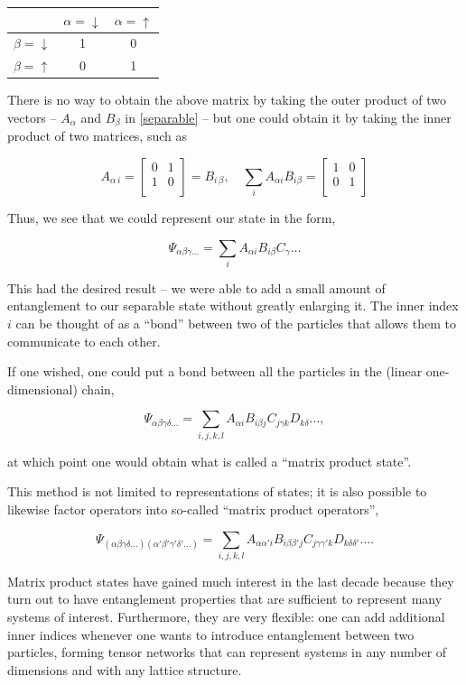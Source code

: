 \documentclass[12pt]{amsbook}
\theoremstyle{plain}
\theoremstyle{definition}
\theoremstyle{remark}
\newcommand{\bmat}[4]{
\begin{bmatrix}
#1 & #2\\
#3 & #4\\
\end{bmatrix}
}
\newcommand{\eqn}[2][]{\begin{equation}\label{#1}#2\end{equation}}
\begin{document}
\begin{center}
\begin{tabular}{c||c|c}
               & $\alpha=\downarrow$ & $\alpha=\uparrow$ \\
\hline
\hline
$\beta=\downarrow$ &       1        &       0      \\
\hline
$\beta=\uparrow$   &       0        &       1
\end{tabular}
\end{center}

There is no way to obtain the above matrix by taking the outer product of two vectors -- $A_\alpha$ and $B_\beta$ in \eqref{separable} -- but one could obtain it by taking the inner product of two matrices, such as

$$A_{\alpha\,i} = \bmat{0}{1}{1}{0} = B_{i\,\beta}, \quad \sum_i A_{\alpha i} B_{i \beta} = \bmat{1}{0}{0}{1} $$

Thus, we see that we could represent our state in the form,

$$\Psi_{\alpha\beta\gamma\dots} = \sum_i A_{\alpha i} B_{i\beta} C_\gamma \dots$$

This had the desired result -- we were able to add a small amount of entanglement to our separable state without greatly enlarging it.  The inner index $i$ can be thought of as a ``bond'' between two of the particles that allows them to communicate to each other.

If one wished, one could put a bond between all the particles in the (linear one-dimensional) chain,

\eqn[mps-oldnotation]{\Psi_{\alpha\beta\gamma\delta\dots} = \sum_{i,j,k,l} A_{\alpha i} B_{i \beta j} C_{j \gamma k} D_{k \delta} \dots,}

\noindent at which point one would obtain what is called a ``matrix product state''.

This method is not limited to representations of states; it is also possible to likewise factor operators into so-called ``matrix product operators'',

$$\Psi_{(\alpha\beta\gamma\delta\dots)(\alpha'\beta'\gamma'\delta'\dots)} = \sum_{i,j,k,l} A_{\alpha\alpha' i} B_{i\beta\beta'j} C_{j\gamma\gamma'k} D_{k \delta\delta'} \dots.$$

Matrix product states have gained much interest in the last decade because they turn out to have entanglement properties that are sufficient to represent many systems of interest.  Furthermore, they are very flexible:  one can add additional inner indices whenever one wants to introduce entanglement between two particles, forming tensor networks that can represent systems in any number of dimensions and with any lattice structure.
\end{document}
